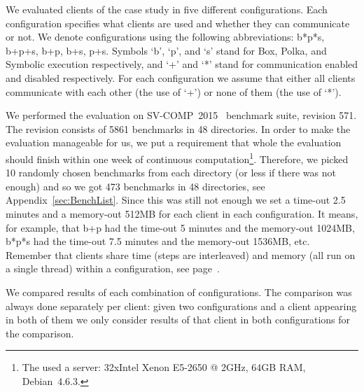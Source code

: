 \documentclass[envcountsame]{llncs}
\begin{document}
We evaluated clients of the case study in five different configurations. Each
configuration specifies what clients are used and whether they can communicate
or not. We denote configurations using the following abbreviations: b*p*s,
b+p+s, b+p, b+s, p+s. Symbols `b', `p', and `s' stand for Box, Polka, and
Symbolic execution respectively, and `+' and `*' stand for communication enabled
and disabled respectively. For each configuration we assume that either all
clients communicate with each other (the use of `+') or none of them (the use of
`*').

We performed the evaluation on SV-COMP~2015~\cite{SVCOMPURL} benchmark suite,
revision 571. The revision consists of 5861 benchmarks in 48 directories. In
order to make the evaluation manageable for us, we put a requirement that whole
the evaluation should finish within one week of continuous
computation\footnote{The used a server: 32xIntel Xenon E5-2650 @ 2GHz, 64GB RAM,
Debian~4.6.3.}. Therefore, we picked 10 randomly chosen benchmarks from each
directory (or less if there was not enough) and so we got 473 benchmarks in 48
directories, see Appendix~\ref{sec:BenchList}. Since this was still not enough
we set a time-out 2.5 minutes and a memory-out 512MB for each client in each
configuration. It means, for example, that b+p had the time-out 5 minutes and
the memory-out 1024MB, b*p*s had the time-out 7.5 minutes and the memory-out
1536MB, etc. Remember that clients share time (steps are interleaved) and memory
(all run on a single thread) within a configuration, see
page~\pageref{sec:CaseStudy}.



We compared results of each combination of configurations. The comparison was
always done separately per client: given two configurations and a client
appearing in both of them we only consider results of that client in both
configurations for the comparison.
\end{document}

